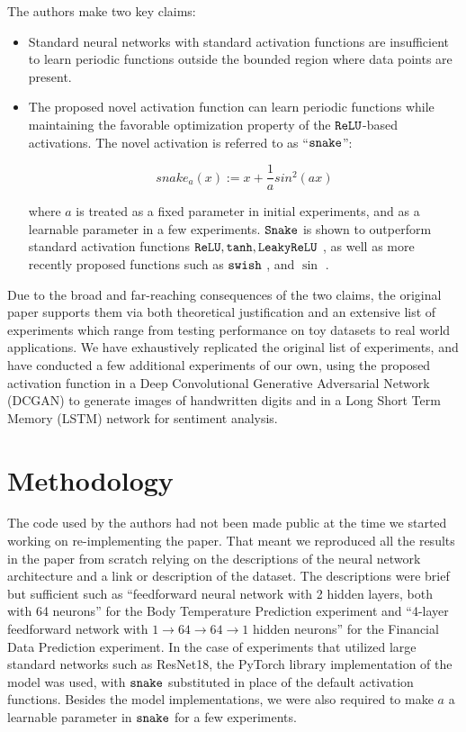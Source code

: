 The authors make two key claims:
\begin{itemize}[leftmargin=*]
    \item Standard neural networks with standard activation functions are insufficient to learn periodic functions outside the bounded region where data points are present.
    \item The proposed novel activation function can learn periodic functions while maintaining the favorable optimization property of the $ \operatorname{\texttt{ReLU}} $-based activations. The novel activation is referred to as ``$ \operatorname{\texttt{snake}} $'':

     \[ snake_{a}(x) := x + \frac{1}{a}sin^{2}(a x) \]

     where $a$ is treated as a fixed parameter in initial experiments, and as a learnable parameter in a few experiments. $ \operatorname{\texttt{Snake}} $ is shown to outperform standard activation functions $ \operatorname{\texttt{ReLU}}, \operatorname{\texttt{tanh}}, \operatorname{\texttt{LeakyReLU}} $ \cite{DBLP:conf/icml/NairH10}, as well as more recently proposed functions such as $ \operatorname{\texttt{swish}} $ \cite{Ramachandran2017SwishAS}, and $ \sin $ \cite{sitzmann2020implicit, Parascandolo2017TamingTW}.
\end{itemize}

Due to the broad and far-reaching consequences of the two claims, the original paper supports them via both theoretical justification and an extensive list of experiments which range from testing performance on toy datasets to real world applications. We have exhaustively replicated the original list of experiments, and have conducted a few additional experiments of our own, using the proposed activation function in a Deep Convolutional Generative Adversarial Network (DCGAN) to generate images of handwritten digits and in a Long Short Term Memory (LSTM) network for sentiment analysis.

\section{Methodology}

The code used by the authors had not been made public at the time we started working on re-implementing the paper. That meant we reproduced all the results in the paper from scratch relying on the descriptions of the neural network architecture and a link or description of the dataset.
The descriptions were brief but sufficient such as ``feedforward neural network with 2 hidden layers, both with 64 neurons'' for the Body Temperature Prediction experiment and ``4-layer feedforward network with $ 1 \rightarrow 64 \rightarrow 64 \rightarrow 1 $ hidden neurons'' for the Financial Data Prediction experiment.
In the case of experiments that utilized large standard networks such as ResNet18, the PyTorch library implementation of the model was used, with $\operatorname{\texttt{snake}}$ substituted in place of the default activation functions.
Besides the model implementations, we were also required to make $a$ a learnable parameter in $ \operatorname{\texttt{snake}} $ for a few experiments.

